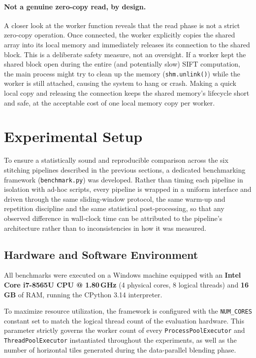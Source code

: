 \documentclass[10pt,twocolumn,letterpaper]{article}
\begin{document}
\paragraph{Not a genuine zero-copy read, by design.} A closer look at 
the worker function reveals that the read phase is not a strict 
zero-copy operation. Once connected, the worker explicitly copies the 
shared array into its local memory and immediately releases its 
connection to the shared block. This is a deliberate safety measure, 
not an oversight. If a worker kept the shared block open during the 
entire (and potentially slow) SIFT computation, the main process might 
try to clean up the memory (\texttt{shm.unlink()}) while the worker is 
still attached, causing the system to hang or crash. Making a quick 
local copy and releasing the connection keeps the shared memory's 
lifecycle short and safe, at the acceptable cost of one local memory 
copy per worker.


\section{Experimental Setup}
\label{sec:experimental-setup}

To ensure a statistically sound and reproducible comparison across the six stitching
pipelines described in the previous sections, a dedicated benchmarking framework
(\texttt{benchmark.py}) was developed. Rather than timing each pipeline in isolation with
ad-hoc scripts, every pipeline is wrapped in a uniform interface and driven through the same
sliding-window protocol, the same warm-up and repetition discipline and the same statistical
post-processing, so that any observed difference in wall-clock time can be attributed to the
pipeline's architecture rather than to inconsistencies in how it was measured.

\subsection{Hardware and Software Environment}
All benchmarks were executed on a Windows machine equipped with an 
\textbf{Intel Core i7-8565U CPU @ 1.80\,GHz} (4 physical cores, 
8 logical threads) and \textbf{16\,GB} of RAM, running the 
CPython 3.14 interpreter. 

To maximize resource utilization, the framework is configured with 
the \texttt{NUM\_CORES} constant set to match the logical thread 
count of the evaluation hardware. This parameter strictly 
governs the worker count of every \texttt{ProcessPoolExecutor} and 
\texttt{ThreadPoolExecutor} instantiated throughout the experiments, 
as well as the number of horizontal tiles generated during the 
data-parallel blending phase.
\end{document}
